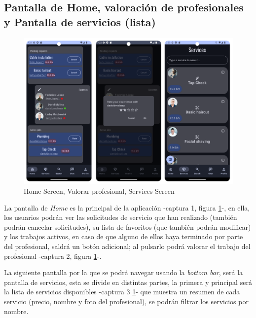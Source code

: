 \subsection{Pantalla de Home, valoración de profesionales y Pantalla de servicios (lista)}
\begin{figure}[h]
	\centering
	\includegraphics[width = 1\textwidth]{Imagenes/capturasApp/home_rate_services.png}
	\caption{Home Screen, Valorar profesional, Services Screen}
	\label{fig:capApp2}
\end{figure}

La pantalla de \textit{Home} es la principal de la aplicación -captura 1, figura \ref{fig:capApp2}-, en ella, los usuarios podrán ver las solicitudes de servicio que han realizado (también podrán cancelar solicitudes), su lista de favoritos (que también podrán modificar) y los trabajos activos, en caso de que alguno de ellos haya terminado por parte del profesional, saldrá un botón adicional; al pulsarlo podrá valorar el trabajo del profesional -captura 2, figura \ref{fig:capApp2}-.

La siguiente pantalla por la que se podrá navegar usando la \textit{bottom bar}, será la pantalla de servicios, esta se divide en distintas partes, la primera y principal será la lista de servicios disponibles -captura 3 \ref{fig:capApp2}- que muestra un resumen de cada servicio (precio, nombre y foto del profesional), se podrán filtrar los servicios por nombre.
\newpage
